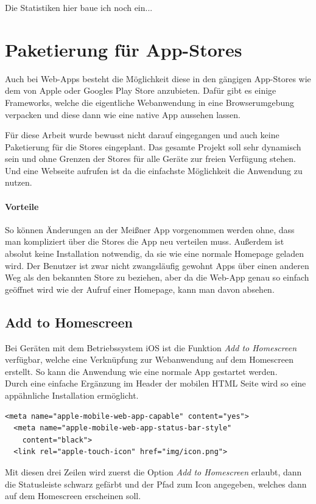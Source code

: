 Die Statistiken hier baue ich noch ein...


\section{Paketierung für App-Stores}
Auch bei Web-Apps besteht die Möglichkeit diese in den gängigen App-Stores wie dem von Apple oder Googles Play Store anzubieten. Dafür gibt es einige Frameworks, welche die eigentliche Webanwendung in eine Browserumgebung verpacken und diese dann wie eine native App aussehen lassen.\par
Für diese Arbeit wurde bewusst nicht darauf eingegangen und auch keine Paketierung für die Stores eingeplant. Das gesamte Projekt soll sehr dynamisch sein und ohne Grenzen der Stores für alle Geräte zur freien Verfügung stehen. Und eine Webseite aufrufen ist da die einfachste Möglichkeit die Anwendung zu nutzen.

\paragraph{Vorteile}
So können Änderungen an der Meißner App vorgenommen werden ohne, dass man kompliziert über die Stores die App neu verteilen muss. Außerdem ist absolut keine Installation notwendig, da sie wie eine normale Homepage geladen wird. Der Benutzer ist zwar nicht zwangsläufig gewohnt Apps über einen anderen Weg als den bekannten Store zu beziehen, aber da die Web-App genau so einfach geöffnet wird wie der Aufruf einer Homepage, kann man davon absehen.

\subsection{Add to Homescreen}
Bei Geräten mit dem Betriebssystem iOS ist die Funktion \emph{Add to Homescreen} verfügbar, welche eine Verknüpfung zur Webanwendung auf dem Homescreen erstellt. So kann die Anwendung wie eine normale App gestartet werden.\\
Durch eine einfache Ergänzung im Header der mobilen HTML Seite wird so eine appähnliche Installation ermöglicht.
\\
\begin{lstlisting}[captionpos=b, caption=Ergänzung im Header der mobilen Seite]
  <meta name="apple-mobile-web-app-capable" content="yes">
  <meta name="apple-mobile-web-app-status-bar-style"
  	content="black">
  <link rel="apple-touch-icon" href="img/icon.png">
\end{lstlisting}
Mit diesen drei Zeilen wird zuerst die Option \emph{Add to Homescreen} erlaubt, dann die Statusleiste schwarz gefärbt und der Pfad zum Icon angegeben, welches dann auf dem Homescreen erscheinen soll.\par

